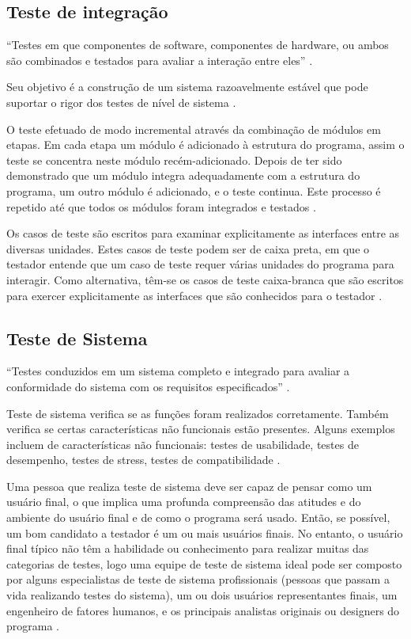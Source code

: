 \subsection{Teste de integração}

“Testes em que componentes de software, componentes de hardware, ou ambos são combinados e testados para avaliar a interação entre eles” \cite{ieee}.

Seu objetivo é a construção de um sistema razoavelmente estável que pode suportar o rigor dos testes de nível de sistema \cite[pág.~18]{naik2008}.

O teste  efetuado de modo incremental através da combinação de módulos em etapas. Em cada etapa um módulo é adicionado à estrutura do programa, assim o teste se concentra neste módulo recém-adicionado. Depois de ter sido demonstrado que um módulo integra adequadamente com a estrutura do programa, um outro módulo é adicionado, e o teste continua. Este processo é repetido até que todos os módulos foram integrados e testados \cite[pág.~134]{lewis2009}.

Os casos de teste são escritos para examinar explicitamente as interfaces entre as diversas unidades. Estes casos de teste podem ser de caixa preta, em que o testador entende que um caso de teste requer várias unidades do programa para interagir. Como alternativa, têm-se os casos de teste caixa-branca que são escritos para exercer explicitamente as interfaces que são conhecidos para o testador \cite{williams2006}.

\subsection{Teste de Sistema}

“Testes conduzidos em um sistema completo e integrado para avaliar a conformidade do sistema com os requisitos especificados” \cite{ieee}.

Teste de sistema verifica se as funções foram realizados corretamente. Também verifica se certas características não funcionais estão presentes. Alguns exemplos incluem de características não funcionais: testes de usabilidade, testes de desempenho, testes de stress, testes de compatibilidade \cite[pág.~134]{lewis2009}.

Uma pessoa que realiza teste de sistema deve ser capaz de pensar como um usuário final, o que implica uma profunda compreensão das atitudes e do ambiente do usuário final e de como o programa será usado. Então, se possível, um bom candidato a testador é um ou mais usuários finais. No entanto, o usuário final típico não têm a habilidade ou conhecimento para realizar muitas das categorias de testes, logo uma equipe de teste de sistema ideal pode ser composto por alguns especialistas de teste de sistema profissionais (pessoas que  passam a vida realizando testes do sistema), um  ou dois usuários representantes finais, um engenheiro de fatores humanos, e os principais analistas originais ou designers do programa \cite[pág.~104]{myers2004}.

